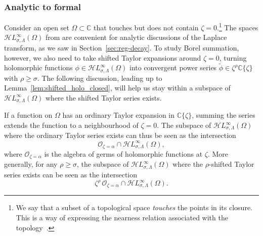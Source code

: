 \documentclass{article}
\newcommand{\singexp}[2]{\mathcal{H}L^\infty_{#1, #2}}
\newcommand{\C}{\mathbb{C}}
\newcommand{\series}[1]{\tilde{#1}}
\theoremstyle{definition}
\theoremstyle{plain}
\begin{document}
\subsubsection{Analytic to formal}
%
Consider an open set $\Omega \subset \C$ that touches but does not contain $\zeta = 0$.\footnote{We say that a subset of a topological space {\em touches} the points in its closure. This is a way of expressing the nearness relation associated with the topology~\cite[Chapter~5, Definition~2.11]{joshi1983gen-top}.} The spaces $\singexp{\sigma}{\Lambda}(\Omega)$ from \cite{reg-sing-volterra} are convenient for analytic discussions of the Laplace transform, as we saw in Section~\ref{sec:reg-decay}. To study Borel summation, however, we also need to take shifted Taylor expansions around $\zeta = 0$, turning holomorphic functions $\phi \in \singexp{\sigma}{\Lambda}(\Omega)$ into convergent power series $\series{\phi} \in \zeta^\rho \C\{\zeta\}$ with $\rho \ge \sigma$. The following discussion, leading up to Lemma~\ref{lem:shifted_holo_closed}, will help us stay within a subspace of $\singexp{\sigma}{\Lambda}(\Omega)$ where the shifted Taylor series exists.

If a function on $\Omega$ has an ordinary Taylor expansion in $\C\{\zeta\}$, summing the series extends the function to a neighbourhood of $\zeta = 0$. The subspace of $\singexp{\sigma}{\Lambda}(\Omega)$ where the ordinary Taylor series exists can thus be seen as the intersection
\[ \mathcal{O}_{\zeta = \alpha} \cap \singexp{\sigma}{\Lambda}(\Omega), \]
where $\mathcal{O}_{\zeta = \alpha}$ is the algebra of germs of holomorphic functions at $\zeta$. More generally, for any $\rho \ge \sigma$, the subspace of $\singexp{\sigma}{\Lambda}(\Omega)$ where the $\rho$-shifted Taylor series exists can be seen as the intersection
\[ \zeta^\rho\,\mathcal{O}_{\zeta = \alpha} \cap \singexp{\sigma}{\Lambda}(\Omega). \]
\end{document}
